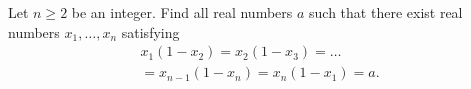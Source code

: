 \documentclass{article}
\begin{document}
\setlength{\parindent}{0pt}
Let $n\ge2$ be an integer. Find all real numbers $a$ such that there exist real numbers $x_{1},\dots,x_{n}$ satisfying
\begin{multline*}
x_{1}(1-x_{2})=x_{2}(1-x_{3})=\dots\\=x_{n-1}(1-x_{n})=x_{n}(1-x_{1})=a.
\end{multline*}
\end{document}
